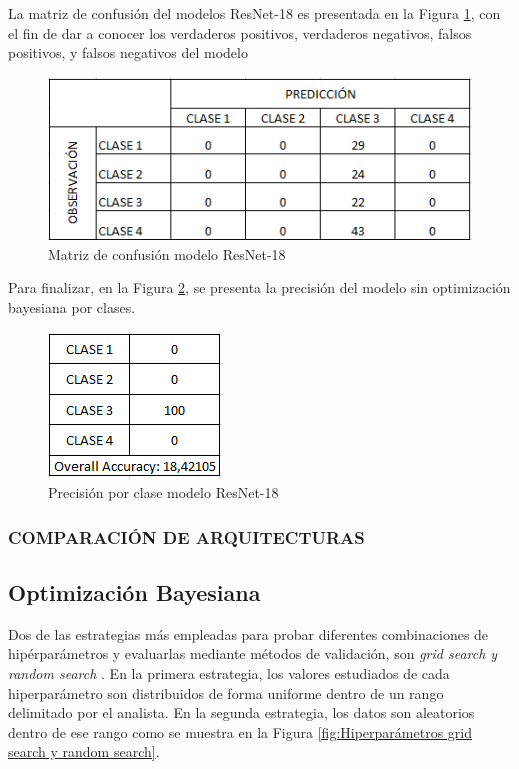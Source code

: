 	La matriz de confusión del modelos ResNet-18 es presentada en la Figura \ref*{MC_RESNET18}, con el fin de dar a conocer los verdaderos positivos, verdaderos negativos, falsos positivos, y falsos negativos del modelo
	
	\begin{figure}[ht]
		\centering
		\includegraphics[scale=0.55]{Figs/71.png}
		\caption{Matriz de confusión modelo ResNet-18}
		\label{MC_RESNET18}
	\end{figure}
		 	
	Para finalizar, en la Figura \ref{clase_RESNET18}, se presenta la precisión del modelo sin optimización bayesiana por clases.
	
	\begin{figure}[ht]
		\centering
		\includegraphics[scale=0.60]{Figs/72.png}
		\caption{Precisión por clase modelo ResNet-18}
		\label{clase_RESNET18}
	\end{figure}
	
			\subsubsection{\MakeUppercase{Comparación de arquitecturas}}
	
	\newpage
	\subsection{Optimización Bayesiana}
	
	Dos de las estrategias más empleadas para probar diferentes combinaciones de hipérparámetros y evaluarlas mediante métodos de validación, son \textit{grid search y random search} \cite{liashchynskyi2019grid}. En la primera estrategia, los valores estudiados de cada hiperparámetro son distribuidos de forma uniforme dentro de un rango delimitado por el analista. En la segunda estrategia, los datos son aleatorios dentro de ese rango como se muestra en la Figura \ref{fig:Hiperparámetros grid search y random search}.
	
